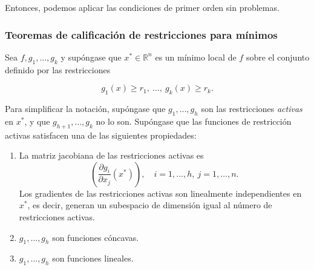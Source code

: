 \documentclass{article}
\begin{document}
Entonces, podemos aplicar las condiciones de primer orden sin problemas.

\subsubsection*{Teoremas de calificación de restricciones para mínimos}


Sea $f, g_1, \ldots, g_k$ y supóngase que 
$x^* \in \mathbb{R}^n$ es un mínimo local de $f$ sobre el conjunto definido por las restricciones

\[
g_1(x) \geq r_1, \ \ldots,\ g_k(x) \geq r_k.
\]

Para simplificar la notación, supóngase que $g_1,\ldots,g_h$ son las restricciones \textit{activas} en $x^*$,
y que $g_{h+1},\ldots,g_k$ no lo son. 
Supóngase que las funciones de restricción activas satisfacen una de las siguientes propiedades:

\begin{enumerate}[label=(\alph*)]
 \color{teal}
\item
La matriz jacobiana de las restricciones activas es
\[
\left( \frac{\partial g_i}{\partial x_j}(x^*) \right),
\quad i=1,\ldots,h,\ j=1,\ldots,n.
\]
Los gradientes de las restricciones activas son linealmente independientes en 
$x^*$, es decir, generan un subespacio de dimensión igual al número de restricciones activas.



\item $g_1,\ldots,g_h$ son funciones cóncavas.

\item $g_1,\ldots,g_h$ son funciones lineales.
\end{enumerate}
\end{document}
